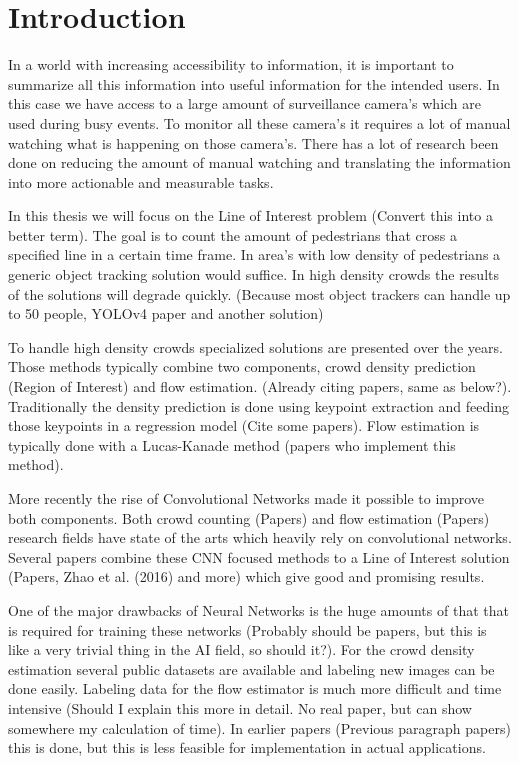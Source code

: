 \section{Introduction}
In a world with increasing accessibility to information, it is important to summarize all this information into useful information for the intended users. In this case we have access to a large amount of surveillance camera's which are used during busy events. To monitor all these camera's it requires a lot of manual watching what is happening on those camera's. There has a lot of research been done on reducing the amount of manual watching and translating the information into more actionable and measurable tasks.

In this thesis we will focus on the Line of Interest problem (Convert this into a better term). The goal is to count the amount of pedestrians that cross a specified line in a certain time frame. In area's with low density of pedestrians a generic object tracking solution would suffice. In high density crowds the results of the solutions will degrade quickly. (Because most object trackers can handle up to 50 people, YOLOv4 paper and another solution)

To handle high density crowds specialized solutions are presented over the years. Those methods typically combine two components, crowd density prediction (Region of Interest) and flow estimation. (Already citing papers, same as below?). Traditionally the density prediction is done using keypoint extraction and feeding those keypoints in a regression model (Cite some papers). Flow estimation is typically done with a Lucas-Kanade method (papers who implement this method).

More recently the rise of Convolutional Networks made it possible to improve both components. Both crowd counting (Papers) and flow estimation (Papers) research fields have state of the arts which heavily rely on convolutional networks. Several papers combine these CNN focused methods to a Line of Interest solution (Papers, Zhao et al. (2016) and more) which give good and promising results.

One of the major drawbacks of Neural Networks is the huge amounts of that that is required for training these networks (Probably should be papers, but this is like a very trivial thing in the AI field, so should it?). For the crowd density estimation several public datasets are available and labeling new images can be done easily. Labeling data for the flow estimator is much more difficult and time intensive (Should I explain this more in detail. No real paper, but can show somewhere my calculation of time). In earlier papers (Previous paragraph papers) this is done, but this is less feasible for implementation in actual applications.

